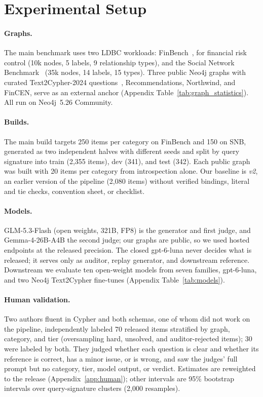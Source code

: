 \documentclass[11pt]{article}
\begin{document}
\section{Experimental Setup}
\label{sec:setup}
\paragraph{Graphs.} The main benchmark uses two LDBC workloads: FinBench~\citep{ldbcfinbench}, for financial risk control (10k nodes, 5 labels, 9 relationship types), and the Social Network Benchmark~\citep{ldbcsnb} (35k nodes, 14 labels, 15 types). Three public Neo4j graphs with curated Text2Cypher-2024 questions~\citep{text2cypher2024dataset}, Recommendations, Northwind, and FinCEN, serve as an external anchor (Appendix Table~\ref{tab:graph_statistics}). All run on Neo4j~5.26 Community.

\paragraph{Builds.} The main build targets 250 items per category on FinBench and 150 on SNB, generated as two independent halves with different seeds and split by query signature into train (2,355 items), dev (341), and test (342). Each public graph was built with 20 items per category from introspection alone. Our baseline is \emph{v2}, an earlier version of the pipeline (2,080 items) without verified bindings, literal and tie checks, convention sheet, or checklist.

\paragraph{Models.} GLM-5.3-Flash (open weights, 321B, FP8) is the generator and first judge, and Gemma-4-26B-A4B the second judge; our graphs are public, so we used hosted endpoints at the released precision. The closed gpt-6-luna never decides what is released; it serves only as auditor, replay generator, and downstream reference. Downstream we evaluate ten open-weight models from seven families, gpt-6-luna, and two Neo4j Text2Cypher fine-tunes (Appendix Table~\ref{tab:models}).

\paragraph{Human validation.} Two authors fluent in Cypher and both schemas, one of whom did not work on the pipeline, independently labeled 70 released items stratified by graph, category, and tier (oversampling hard, unsolved, and auditor-rejected items); 30 were labeled by both. They judged whether each question is clear and whether its reference is correct, has a minor issue, or is wrong, and saw the judges' full prompt but no category, tier, model output, or verdict. Estimates are reweighted to the release (Appendix~\ref{app:human}); other intervals are 95\% bootstrap intervals over query-signature clusters (2,000 resamples).
\end{document}
